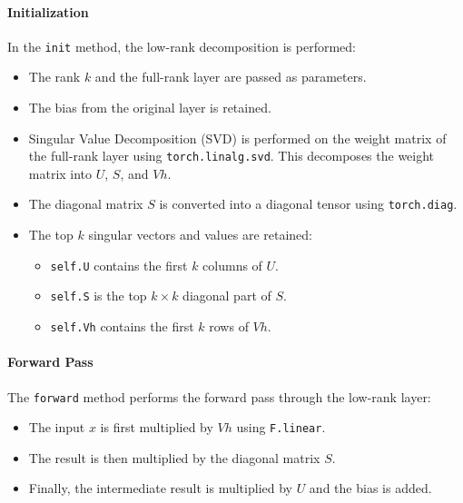             \paragraph{Initialization}
            In the \texttt{init} method, the low-rank decomposition is performed:
            \begin{itemize}
                \item The rank \(k\) and the full-rank layer are passed as parameters.
                \item The bias from the original layer is retained.
                \item Singular Value Decomposition (SVD) is performed on the weight matrix of the full-rank layer using \texttt{torch.linalg.svd}. This decomposes the weight matrix into \(U\), \(S\), and \(Vh\).
                \item The diagonal matrix \(S\) is converted into a diagonal tensor using \texttt{torch.diag}.
                \item The top \(k\) singular vectors and values are retained:
                \begin{itemize}
                    \item \texttt{self.U} contains the first \(k\) columns of \(U\).
                    \item \texttt{self.S} is the top \(k \times k\) diagonal part of \(S\).
                    \item \texttt{self.Vh} contains the first \(k\) rows of \(Vh\).
                \end{itemize}
            \end{itemize}
            
            \paragraph{Forward Pass}
            The \texttt{forward} method performs the forward pass through the low-rank layer:
            \begin{itemize}
                \item The input \(x\) is first multiplied by \(Vh\) using \texttt{F.linear}.
                \item The result is then multiplied by the diagonal matrix \(S\).
                \item Finally, the intermediate result is multiplied by \(U\) and the bias is added.
            \end{itemize}
            
